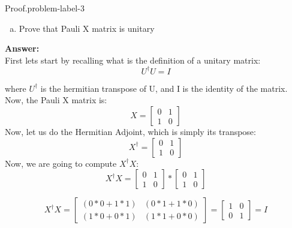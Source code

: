 \begin{problem}{ Proof.}{problem-label-3}
	
	\begin{enumerate}[(a)]
		\item Prove that Pauli X matrix is unitary
	\end{enumerate}
	\textbf{Answer:}\\
	First lets start by recalling what is the definition of a unitary matrix:\\
	
	\[
	U^{\dagger}U = I
	\]
	
	where $U^{\dagger}$ is the hermitian transpose of U, and I is the identity of the matrix. Now, the Pauli X matrix is:
	\[
	X = 
	\begin{bmatrix}
		0 & 1\\
		1 & 0
	\end{bmatrix}
	\]
	Now, let us do the Hermitian Adjoint, which is simply its transpose:
	\[
	X^{\dagger}= 
	\begin{bmatrix}
		0 & 1\\
		1 & 0
	\end{bmatrix}
	\]
	Now, we are going to compute $X^{\dagger}X$:
	\[
	X^{\dagger}X = 
	\begin{bmatrix}
		0 & 1\\
		1 & 0
	\end{bmatrix}
	*
	\begin{bmatrix}
		0 & 1\\
		1 & 0
	\end{bmatrix}
	\]
	
	\[
	X^{\dagger}X = 
	\begin{bmatrix}
		(0*0 + 1*1) & (0*1+1*0)\\
		(1*0+0*1)& (1*1+0*0)
	\end{bmatrix}
	=
	\begin{bmatrix}
		1 & 0\\
		0 & 1
	\end{bmatrix}
	= I
	\]
	
\end{problem}


